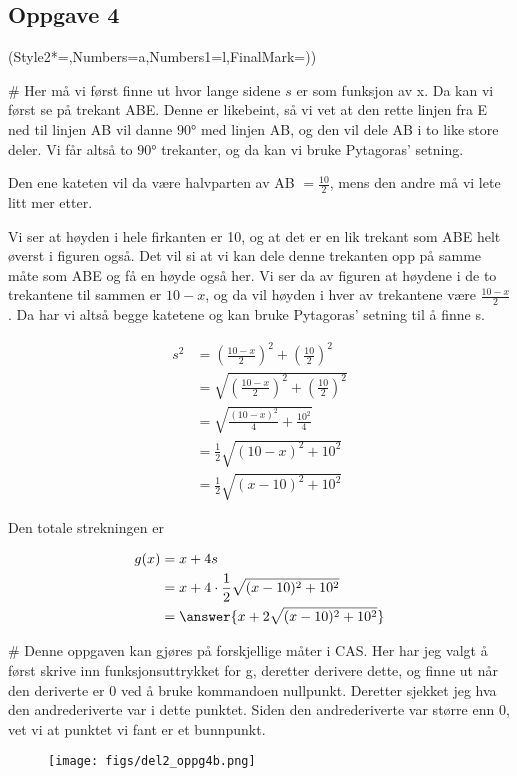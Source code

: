 \subsection*{Oppgave 4}

\begin{easylist}
	\ListProperties(Style2*=,Numbers=a,Numbers1=l,FinalMark={)})
	
	# Her må vi først finne ut hvor lange sidene $s$ er som funksjon av x. Da kan vi først se på trekant ABE. Denne er likebeint, så vi vet at den rette linjen fra E ned til linjen AB vil danne $\ang{90}$ med linjen AB, og den vil dele AB i to like store deler. Vi får altså to $\ang{90}$ trekanter, og da kan vi bruke Pytagoras' setning. 
	
	Den ene kateten vil da være halvparten av AB $ = \frac{10}{2}$, mens den andre må vi lete litt mer etter.
	
	Vi ser at høyden i hele firkanten er 10, og at det er en lik trekant som ABE helt øverst i figuren også. Det vil si at vi kan dele denne trekanten opp på samme måte som ABE og få en høyde også her. Vi ser da av figuren at høydene i de to trekantene til sammen er $10-x$, og da vil høyden i hver av trekantene være $\frac{10-x}{2}$. Da har vi altså begge katetene og kan bruke Pytagoras' setning til å finne s.
	
	\begin{equation*}
	\begin{aligned}
		s^2 &= \left (\frac{10-x}{2} \right)^2	+ \left(\frac{10}{2} \right)^2 \\
		 & = \sqrt{\left (\frac{10-x}{2} \right)^2 + \left(\frac{10}{2} \right)^2} \\
		 & = \sqrt{\frac{(10-x)^2}{4} + \frac{10^2}{4}} \\
		 & = \frac{1}{2} \sqrt{(10-x)^2 + 10^2} \\
		 & = \frac{1}{2} \sqrt{(x-10)^2 + 10^2} 		
	\end{aligned}
	\end{equation*}
	
	Den totale strekningen er
	
	\begin{equation*}
		\begin{aligned}
			g(x) & = x + 4s \\
			& = x + 4 \cdot  \frac{1}{2} \sqrt{(x-10)^2 + 10^2} \\
			& = \answer{x + 2\sqrt{(x-10)^2 + 10^2}}
		\end{aligned}	
	\end{equation*}
	
	
	# Denne oppgaven kan gjøres på forskjellige måter i CAS. Her har jeg valgt å først skrive inn funksjonsuttrykket for g, deretter derivere dette, og finne ut når den deriverte er $0$ ved å bruke kommandoen nullpunkt. Deretter sjekket jeg hva den andrederiverte var i dette punktet. Siden den andrederiverte var større enn $0$, vet vi at punktet vi fant er et bunnpunkt.
	
	
	\begin{figure}[ht!]
		\centering
		\texttt{[image: figs/del2\_oppg4b.png]}
	\end{figure}
\end{easylist}

